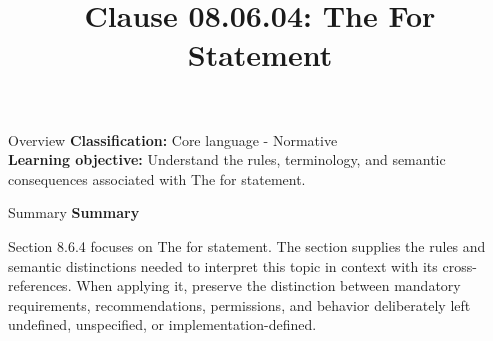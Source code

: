 \documentclass[10pt,letterpaper]{article}
\title{Clause 08.06.04: The For Statement}
\author{}
\date{}
\begin{document}
\maketitle
\begin{CornellOverviewBox}{Overview}
\textbf{Classification:} Core language - Normative\\[2pt]
\textbf{Learning objective:} Understand the rules, terminology, and semantic consequences associated with The for statement.
\end{CornellOverviewBox}\begin{CornellSummaryBox}{Summary}
{\sffamily\bfseries\color{Accent} Summary}\par\vspace{3pt}Section 8.6.4 focuses on The for statement. The section supplies the rules and semantic distinctions needed to interpret this topic in context with its cross-references. When applying it, preserve the distinction between mandatory requirements, recommendations, permissions, and behavior deliberately left undefined, unspecified, or implementation-defined.
\end{CornellSummaryBox}
\end{document}
